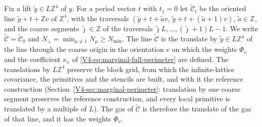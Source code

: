 \documentclass[11pt]{article}
\numberwithin{equation}{section}
\theoremstyle{remark}
\theoremstyle{plain}
\begin{document}
Fix a lift $\tilde y\in L\mathbb Z^4$ of $y$. For a period vector $t$ with $t_1=0$ let $\widetilde{\mathcal C}_t$ be the oriented line $\tilde y+t+\mathbb Zv$ of $\mathbb Z^4$, with the traversals $(\tilde y+t+\tilde av,\,\tilde y+t+(\tilde a+1)v)$, $\tilde a\in\mathbb Z$, and the coarse segments $\tilde\jmath\in\mathbb Z$ of the traversals $\tilde\jmath L,\ldots,(\tilde\jmath+1)L-1$. We write $\widetilde{\mathcal C}=\widetilde{\mathcal C}_0$ and $N_{\perp}=\min_{\mu\neq1}N_{\mu}\geqslant N_{\min}$. The line $\widetilde{\mathcal C}$ is the translate by $\tilde y\in L\mathbb Z^4$ of the line through the coarse origin in the orientation $v$ on which the weights $\Phi_v$ and the coefficient $\kappa_v$ of \eqref{V4-eq:marginal-full-perimeter} are defined. The translations by $L\mathbb Z^4$ preserve the block grid, from which the infinite-lattice covariance, the primitives and the stencils are built, and with it the reference construction (Section~\ref{V4-sec:marginal-perimeter}: translation by one coarse segment preserves the reference construction, and every local primitive is translated by a multiple of $L$). The gas of $\widetilde{\mathcal C}$ is therefore the translate of the gas of that line, and it has the weights $\Phi_v$.
\end{document}
